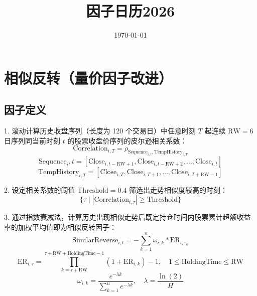 \documentclass{article}
\title{因子日历2026}
\date{\today}
\begin{document}
\maketitle

\section{相似反转（量价因子改进）}

\subsection{因子定义}
1. 滚动计算历史收盘序列（长度为 120 个交易日）中任意时刻 \( T \) 起连续 \( \mathrm{RW}=6 \) 日序列同当前时刻 \( t \) 的股票收盘价序列的皮尔逊相关系数：
\begin{equation}
    \mathrm{Correlation}_{i,T} = \rho_{\mathrm{Sequence}_{i,t}, \mathrm{Temp  History}_{i,T}}
\end{equation}
\begin{equation}
    \mathrm{Sequence}_{i},t = [\mathrm{Close}_{i,t-\mathrm{RW}+1}, \mathrm{Close}_{i,t-\mathrm{RW}+2}, \dots, \mathrm{Close}_{i,t}]
\end{equation}
\begin{equation}
    \mathrm{Temp  History}_{i,T} = [\mathrm{Close}_{i,T}, \mathrm{Close}_{i,T+1}, \dots, \mathrm{Close}_{i,T+\mathrm{RW}-1}]
\end{equation}

2. 设定相关系数的阈值 \( \mathrm{Threshold}=0.4 \) 筛选出走势相似度较高的时刻：
\begin{equation}
    \{ \tau \mid |\mathrm{Correlation}_{i,\tau}| \geq \mathrm{Threshold} \}
\end{equation}

3. 通过指数衰减法，计算历史出现相似走势后既定持仓时间内股票累计超额收益率的加权平均值即为相似反转因子：
\begin{equation}
    \mathrm{SimilarReverse}_{i,t} = -\sum_{k=1}^n \omega_{i,k} * \mathrm{ER}_{i,\tau_k}
\end{equation}
\begin{equation}
    \mathrm{ER}_{i,\tau} = \prod_{k=\tau+\mathrm{RW}}^{\tau+\mathrm{RW}+\mathrm{HoldingTime}-1} (1 + \mathrm{ER}_{i,k}) - 1, \quad 1 \leq \mathrm{HoldingTime} \leq \mathrm{RW}
\end{equation}
\begin{equation}
    \omega_{i,k} = \frac{e^{-\lambda k}}{\sum_{k=1}^n e^{-\lambda k}}, \quad \lambda = \frac{\ln(2)}{H}
\end{equation}
\end{document}
